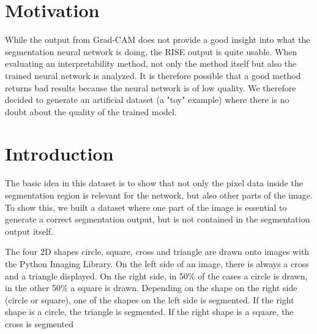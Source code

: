 \section{Motivation}
While the output from Grad-CAM does not provide a good insight into what the segmentation neural network is doing, the RISE output is quite usable. When evaluating an interpretability method, not only the method itself but also the trained neural network is analyzed. It is therefore possible that a good method returns bad results because the neural network is of low quality. We therefore decided to generate an artificial dataset (a "toy" example) where there is no doubt about the quality of the trained model.


\section{Introduction}

The basic idea in this dataset is to show that not only the pixel data inside the segmentation region is relevant for the network, but also other parts of the image. To show this, we built a dataset where one part of the image is essential to generate a correct segmentation output, but is not contained in the segmentation output itself.

The four 2D shapes circle, square, cross and triangle are drawn onto images with the Python Imaging Library. On the left side of an image, there is always a cross and a triangle displayed. On the right side, in 50\% of the cases a circle is drawn, in the other 50\% a square is drawn. Depending on the shape on the right side (circle or square), one of the shapes on the left side is segmented. If the right shape is a circle, the triangle is segmented. If the right shape is a square, the cross is segmented

